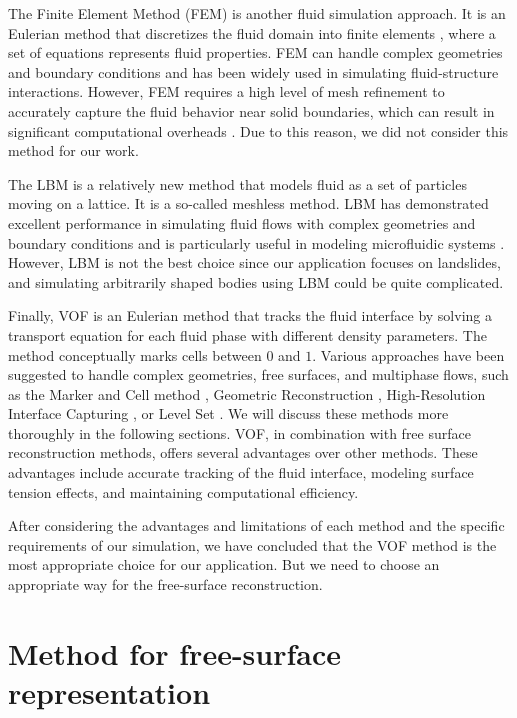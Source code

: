 The Finite Element Method (FEM) is another fluid simulation approach. It is an Eulerian method that discretizes the fluid domain into finite elements \cite{FEM}, where a set of equations represents fluid properties. FEM can handle complex geometries and boundary conditions and has been widely used in simulating fluid-structure interactions. However, FEM requires a high level of mesh refinement to accurately capture the fluid behavior near solid boundaries, which can result in significant computational overheads \cite{FEM_2}. Due to this reason, we did not consider this method for our work.

The LBM \cite{begum2008lattice} is a relatively new method that models fluid as a set of particles moving on a lattice. It is a so-called meshless method. LBM has demonstrated excellent performance in simulating fluid flows with complex geometries and boundary conditions and is particularly useful in modeling microfluidic systems \cite{aidun2010lattice}. However, LBM is not the best choice since our application focuses on landslides, and simulating arbitrarily shaped bodies using LBM could be quite complicated.

Finally, VOF is an Eulerian method that tracks the fluid interface by solving a transport equation for each fluid phase with different density parameters. The method conceptually marks cells between $0$ and $1$. Various approaches have been suggested to handle complex geometries, free surfaces, and multiphase flows, such as the Marker and Cell method \cite{mac}, Geometric Reconstruction \cite{VOF_reocnstr}, High-Resolution Interface Capturing \cite{HIRC}, or Level Set \cite{VOF_level_set}. We will discuss these methods more thoroughly in the following sections. VOF, in combination with free surface reconstruction methods, offers several advantages over other methods. These advantages include accurate tracking of the fluid interface, modeling surface tension effects, and maintaining computational efficiency.

After considering the advantages and limitations of each method and the specific requirements of our simulation, we have concluded that the VOF method is the most appropriate choice for our application. But we need to choose an appropriate way for the free-surface reconstruction.

\section{Method for free-surface representation} %

